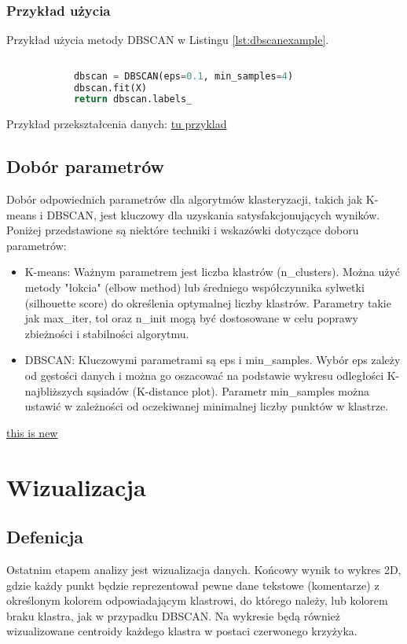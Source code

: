 			
		\subsubsection{Przykład użycia}
		
			Przykład użycia metody DBSCAN w Listingu \ref{lst:dbscanexample}.
		
			\begin{lstlisting}[language=Python, caption={Przykład użycia t-SNE do osadzania danych}, label={lst:dbscanexample}]
			
			dbscan = DBSCAN(eps=0.1, min_samples=4)
			dbscan.fit(X)
			return dbscan.labels_
			\end{lstlisting}
			
			
			Przykład przekształcenia danych:
				\underline{tu przyklad}
		
	\subsection{Dobór parametrów}
		Dobór odpowiednich parametrów dla algorytmów klasteryzacji, takich jak K-means i DBSCAN, jest kluczowy dla uzyskania satysfakcjonujących wyników. Poniżej przedstawione są niektóre techniki i wskazówki dotyczące doboru parametrów:
		
		\begin{itemize}
			\item K-means: Ważnym parametrem jest liczba klastrów (n\_clusters). Można użyć metody "łokcia" (elbow method) lub średniego współczynnika sylwetki (silhouette score) do określenia optymalnej liczby klastrów. Parametry takie jak max\_iter, tol oraz n\_init mogą być dostosowane w celu poprawy zbieżności i stabilności algorytmu.
			\item DBSCAN: Kluczowymi parametrami są eps i min\_samples. Wybór eps zależy od gęstości danych i można go oszacować na podstawie wykresu odległości K-najbliższych sąsiadów (K-distance plot). Parametr min\_samples można ustawić w zależności od oczekiwanej minimalnej liczby punktów w klastrze.
		\end{itemize}
		
		\underline{this is new}
			
	
	
\section{Wizualizacja}
	\subsection{Defenicja}
		Ostatnim etapem analizy jest wizualizacja danych. Końcowy wynik to wykres 2D, gdzie każdy punkt będzie reprezentował pewne dane tekstowe (komentarze) z określonym kolorem odpowiadającym klastrowi, do którego należy, lub kolorem braku klastra, jak w przypadku DBSCAN. Na wykresie będą również wizualizowane centroidy każdego klastra w postaci czerwonego krzyżyka.
	
